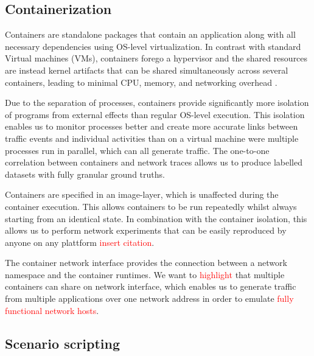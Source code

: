 \documentclass{article}
\begin{document}
\subsection{Containerization}
Containers are standalone packages that contain an application along with all necessary dependencies using OS-level virtualization. In contrast with standard Virtual machines (VMs), containers forego a hypervisor and the shared resources are instead kernel artifacts that can be shared simultaneously across several containers, leading to minimal CPU, memory, and networking overhead \cite{kolyshkin2006virtualization}.



Due to the separation of processes, containers provide significantly more isolation of programs from external effects than regular OS-level execution. This isolation enables us to monitor processes better and create more accurate links between traffic events and individual activities than on a virtual machine were multiple processes run in parallel, which can all generate traffic. The one-to-one correlation between containers and network traces allows us to produce labelled datasets with fully granular ground truths. 

Containers are specified in an image-layer, which is unaffected during the container execution.
This allows containers to be run repeatedly whilst always starting from an identical state. In combination with the container isolation, this allows us to perform network experiments that can be easily reproduced by anyone on any plattform \textcolor{red}{insert citation}. 


The container network interface provides the connection between a network namespace and the container runtimes. We want to \textcolor{red}{highlight} that multiple containers can share on network interface, which enables us to generate traffic from multiple applications over one network address in order to emulate \textcolor{red}{fully functional network hosts}.
 

\subsection{Scenario scripting}\label{Sec:Scenarios}
\end{document}
